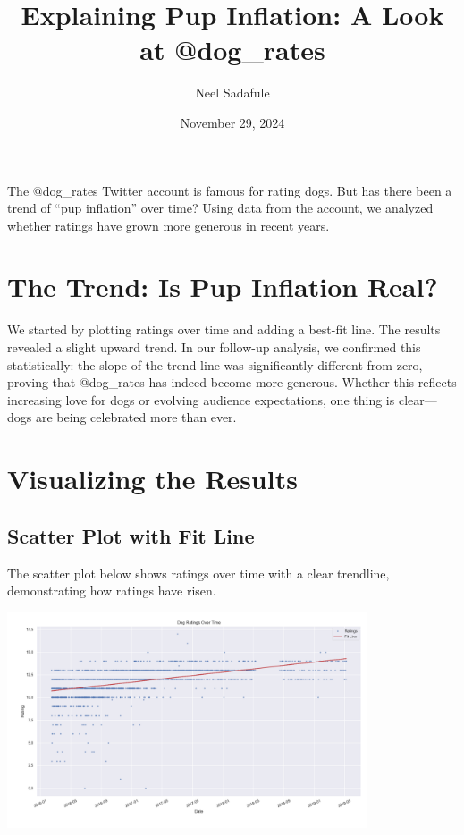 \documentclass{article}
\begin{document}
\title{Explaining Pup Inflation: A Look at @dog\_rates}
\author{Neel Sadafule}
\date{November 29, 2024}
\maketitle

The @dog\_rates Twitter account is famous for rating dogs. But has there been a trend of “pup inflation” over time? Using data from the account, we analyzed whether ratings have grown more generous in recent years.

\section*{The Trend: Is Pup Inflation Real?}
We started by plotting ratings over time and adding a best-fit line. The results revealed a slight upward trend. In our follow-up analysis, we confirmed this statistically: the slope of the trend line was significantly different from zero, proving that @dog\_rates has indeed become more generous. Whether this reflects increasing love for dogs or evolving audience expectations, one thing is clear—dogs are being celebrated more than ever.

\section*{Visualizing the Results}
\subsection*{Scatter Plot with Fit Line}
The scatter plot below shows ratings over time with a clear trendline, demonstrating how ratings have risen.

\begin{center}
\includegraphics[width=0.8\textwidth]{scatter_plot.png} %
\end{center}
\end{document}
